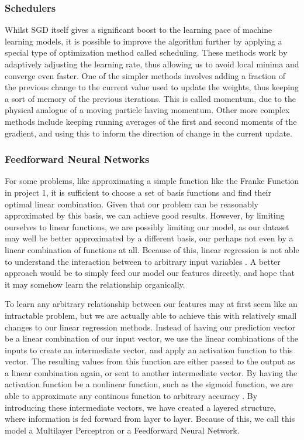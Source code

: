 \documentclass[onecolumn,10pt,cleanfoot]{asme2ej}
\begin{document}
\subsubsection{Schedulers}

Whilst SGD itself gives a significant boost to the learning pace of machine learning models, it is possible to improve the algorithm further by applying a special type of optimization method called scheduling. These methods work by adaptively adjusting the learning rate, thus allowing us to avoid local minima and converge even faster. One of the simpler methods involves adding a fraction of the previous change to the current value used to update the weights, thus keeping a sort of memory of the previous iterations. This is called momentum, due to the physical analogue of a moving particle having momentum. Other more complex methods include keeping running averages of the first and second moments of the gradient, and using this to inform the direction of change in the current update.

\subsubsection{Feedforward Neural Networks}

For some problems, like approximating a simple function like the Franke Function in project 1, it is sufficient to choose a set of basis functions and find their optimal linear combination. Given that our problem can be reasonably approximated by this basis, we can achieve good results. However, by limiting ourselves to linear functions, we are possibly limiting our model, as our dataset may well be better approximated by a different basis, our perhaps not even by a linear combination of functions at all. Because of this, linear regression is not able to understand the interaction between to arbitrary input variables \cite[165]{gbc}. A better approach would be to simply feed our model our features directly, and hope that it may somehow learn the relationship organically.

To learn any arbitrary relationship between our features may at first seem like an intractable problem, but we are actually able to achieve this with relatively small changes to our linear regression methods. Instead of having our prediction vector be a linear combination of our input vector, we use the linear combinations of the inputs to create an intermediate vector, and apply an activation function to this vector. The resulting values from this function are either passed to the output as a linear combination again, or sent to another intermediate vector. By having the activation function be a nonlinear function, such as the sigmoid function, we are able to approximate any continous function to arbitrary accuracy \cite[230]{cmb}. By introducing these intermediate vectors, we have created a layered structure, where information is fed forward from layer to layer. Because of this, we call this model a Multilayer Perceptron or a Feedforward Neural Network.
\end{document}
